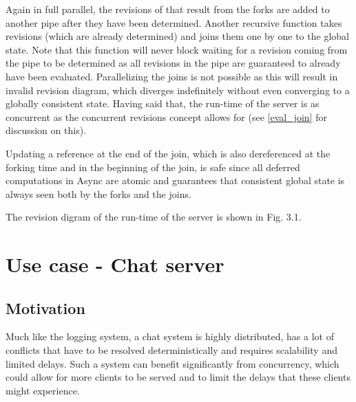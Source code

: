 \documentclass[12pt,twoside,notitlepage]{report}
\begin{document}
{Again in full parallel, the revisions of that result from the forks are added to another pipe after they have been determined. Another recursive function takes revisions (which are already determined) and joins them one by one to the global state. Note that this function will never block waiting for a revision coming from the pipe to be determined as all revisions in the pipe are guaranteed to already have been evaluated. Parallelizing the joins is not possible as this will result in invalid revision diagram, which diverges indefinitely without even converging to a globally consistent state. Having said that, the run-time of the server is as concurrent as the concurrent revisions concept allows for (see \ref{eval_join} for discussion on this).

Updating a reference at the end of the join, which is also dereferenced at the forking time and in the beginning of the join, is safe since all deferred computations in Async are atomic and guarantees that consistent global state is always seen both by the forks and the joins. 

The revision digram of the run-time of the server is shown in Fig. 3.1. 

\section{Use case - Chat server}
\label{chat_server}
\subsection{Motivation}

Much like the logging system, a chat system is highly distributed, has a lot of conflicts that have to be resolved deterministically and requires scalability and limited delays. Such a system can benefit significantly from concurrency, which could allow for more clients to be served and to limit the delays that these clients might experience.


}
\end{document}
